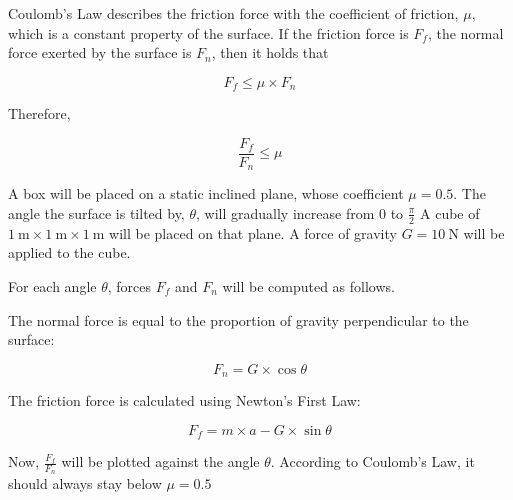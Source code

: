 Coulomb's Law describes the friction force with the coefficient of friction, $\mu$, which is a constant property of the surface.
If the friction force is $F_f$, the normal force exerted by the surface is $F_n$, then it holds that

\begin{equation}
F_f \leq \mu \times F_n
\end{equation}

Therefore,

\begin{equation}
\frac{F_f}{F_n} \leq \mu
\end{equation}

A box will be placed on a static inclined plane, whose coefficient $\mu = 0.5$.
The angle the surface is tilted by, $\theta$, will gradually increase from 0 to $\frac{\pi}{2}$
A cube of $\SI{1}{\m} \times \SI{1}{\m} \times \SI{1}{\m}$ will be placed on that plane.
A force of gravity $G = \SI{10}{\N}$ will be applied to the cube.

\begin{center}
  \end{center}

For each angle $\theta$, forces $F_f$ and $F_n$ will be computed as follows.

The normal force is equal to the proportion of gravity perpendicular to the surface:

\begin{equation}
F_n = G \times \cos \theta
\end{equation}

The friction force is calculated using Newton's First Law:

\begin{equation}
F_f = m \times a - G \times \sin \theta
\end{equation}

Now, $\frac{F_f}{F_n}$ will be plotted against the angle $\theta$. According to Coulomb's Law, it should always stay below $\mu = 0.5$


